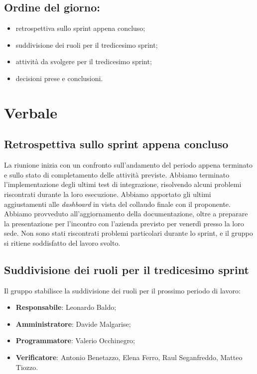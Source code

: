 \documentclass[italian,12pt]{article}
\begin{document}
\subsection*{Ordine del giorno:}
\begin{itemize}
	\item retrospettiva sullo sprint appena concluso;
	\item suddivisione dei ruoli per il tredicesimo sprint;
	\item attività da svolgere per il tredicesimo sprint;
	\item decisioni prese e conclusioni.
\end{itemize}


\newpage

\section{Verbale}

\subsection{Retrospettiva sullo sprint appena concluso}
La riunione inizia con un confronto sull'andamento del periodo appena terminato e sullo stato di completamento delle attività previste. Abbiamo terminato l'implementazione degli ultimi test di integrazione, risolvendo alcuni problemi riscontrati durante la loro esecuzione. Abbiamo apportato gli ultimi aggiustamenti alle \textit{dashboard} in vista del collaudo finale con il proponente. Abbiamo provveduto all'aggiornamento della documentazione, oltre a preparare la presentazione per l'incontro con l'azienda previsto per venerdì presso la loro sede. Non sono stati riscontrati problemi particolari durante lo sprint, e il gruppo si ritiene soddisfatto del lavoro svolto.

\subsection{Suddivisione dei ruoli per il tredicesimo sprint}
Il gruppo stabilisce la suddivisione dei ruoli per il prossimo periodo di lavoro:
\begin{itemize}
	\item \textbf{Responsabile}: Leonardo Baldo;
	\item \textbf{Amministratore}: Davide Malgarise;
	\item \textbf{Programmatore}: Valerio Occhinegro;
	\item \textbf{Verificatore}: Antonio Benetazzo, Elena Ferro, Raul Seganfreddo, Matteo Tiozzo.
\end{itemize}
\end{document}
